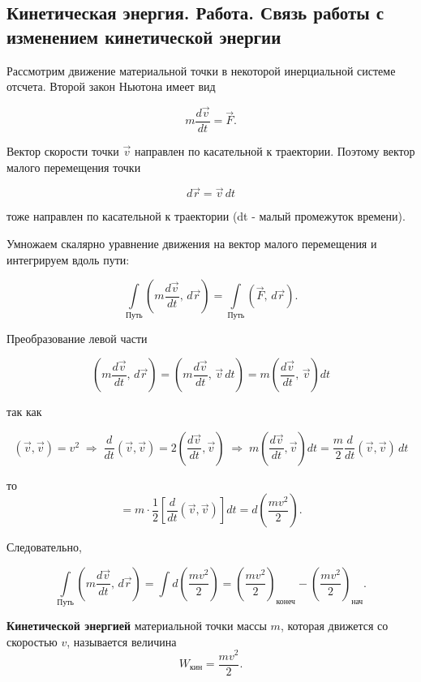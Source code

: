 \documentclass[a4paper,12pt]{article}
\begin{document}
\vspace{0.8em}

\subsection*{Кинетическая энергия. Работа. Связь работы с изменением кинетической энергии}

Рассмотрим движение материальной точки в некоторой инерциальной системе отсчета. Второй закон Ньютона имеет вид

\[
m \frac{d\vec v}{dt} = \vec F.
\]

Вектор скорости точки $\vec v$ направлен по касательной к траектории. Поэтому вектор малого перемещения точки

\[
d\vec r = \vec v \, dt
\]

тоже направлен по касательной к траектории (dt - малый промежуток времени). 

Умножаем скалярно уравнение движения на вектор малого перемещения и интегрируем вдоль пути:

\[
\int\limits_{\text{Путь}}
\left(
m \frac{d\vec v}{dt},\, d\vec r
\right)
=
\int\limits_{\text{Путь}}
\left(
\vec F,\, d\vec r
\right).
\]

Преобразование левой части

\[
\left(
m \frac{d\vec v}{dt},\, d\vec r
\right)
=
\left(
m \frac{d\vec v}{dt},\, \vec v \, dt
\right)
=
m \left(
\frac{d\vec v}{dt},\, \vec v
\right) dt
\]

так как 

\[
(\vec v,\vec v)=v^2
\;\Rightarrow\;
\frac{d}{dt}(\vec v,\vec v)
=
2\left(\frac{d\vec v}{dt},\vec v\right)
\;\Rightarrow\;
m\left(\frac{d\vec v}{dt},\vec v\right)dt
=
\frac{m}{2}\frac{d}{dt}(\vec v,\vec v)\,dt
\]

то
\[
=
m \cdot \frac{1}{2}
\left[
\frac{d}{dt}(\vec v,\vec v)
\right] dt
=
d\left(
\frac{mv^2}{2}
\right).
\]



Следовательно,

\[
\int\limits_{\text{Путь}}
\left(
m \frac{d\vec v}{dt},\, d\vec r
\right)
=
\int d\left(
\frac{mv^2}{2}
\right)
=
\left(
\frac{mv^2}{2}
\right)_{\text{конеч}}
-
\left(
\frac{mv^2}{2}
\right)_{\text{нач}}.
\]

\begin{definitionbox}
\textbf{Кинетической энергией} материальной точки массы $m$, которая движется со скоростью $v$, называется величина
\[
W_{\text{кин}} = \frac{mv^2}{2}.
\]
\end{definitionbox}
\end{document}
